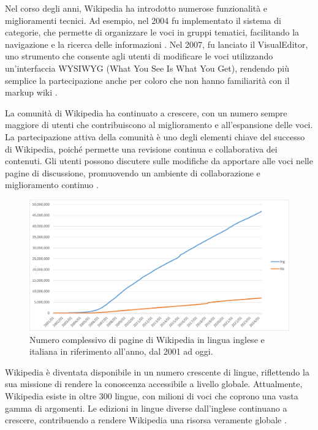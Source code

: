 \documentclass[12pt,a4paper]{report}
\begin{document}
Nel corso degli anni, Wikipedia ha introdotto numerose funzionalità e miglioramenti tecnici. Ad esempio, nel 2004 fu implementato il sistema di categorie, che permette di organizzare le voci in gruppi tematici, facilitando la navigazione e la ricerca delle informazioni \cite{jemielniak2014wikipedia}. Nel 2007, fu lanciato il VisualEditor, uno strumento che consente agli utenti di modificare le voci utilizzando un'interfaccia WYSIWYG (What You See Is What You Get), rendendo più semplice la partecipazione anche per coloro che non hanno familiarità con il markup wiki \cite{history_of_wikis}.

La comunità di Wikipedia ha continuato a crescere, con un numero sempre maggiore di utenti che contribuiscono al miglioramento e all'espansione delle voci. La partecipazione attiva della comunità è uno degli elementi chiave del successo di Wikipedia, poiché permette una revisione continua e collaborativa dei contenuti. Gli utenti possono discutere sulle modifiche da apportare alle voci nelle pagine di discussione, promuovendo un ambiente di collaborazione e miglioramento continuo \cite{denning2005wikipedia}.

\begin{figure}
    \includegraphics[width=\linewidth]{Immagini/Grafico pagine wikipedia excel.png}
    \caption{Numero complessivo di pagine di Wikipedia in lingua inglese e italiana in riferimento all'anno, dal 2001 ad oggi.\cite{wikimedia_stats} }
    \label{fig:wikiPagesYear}
\end{figure}

Wikipedia è diventata disponibile in un numero crescente di lingue, riflettendo la sua missione di rendere la conoscenza accessibile a livello globale. Attualmente, Wikipedia esiste in oltre 300 lingue, con milioni di voci che coprono una vasta gamma di argomenti. Le edizioni in lingue diverse dall'inglese continuano a crescere, contribuendo a rendere Wikipedia una risorsa veramente globale \cite{reagle2010good}.
\end{document}
